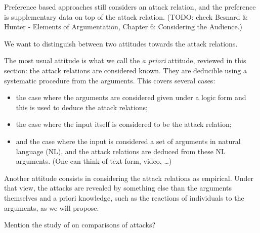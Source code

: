 \documentclass[version=3.21, pagesize, twoside=off, bibliography=totoc, DIV=calc, fontsize=12pt, a4paper, french, english]{scrartcl}
\begin{document}
Preference based approaches still considers an attack relation, and the preference is supplementary data on top of the attack relation. (TODO: check Besnard \& Hunter - Elements of Argumentation, Chapter 6: Considering the Audience.) 

We want to distinguish between two attitudes towards the attack relations. 

The most usual attitude is what we call the \emph{a priori} attitude, reviewed in this section: the attack relations are considered known. They are deducible using a systematic procedure from the arguments. This covers several cases:
\begin{itemize}
\item the case where the arguments are considered given under a logic form and this is used to deduce the attack relations;
\item the case where the input itself is considered to be the attack relation;
\item and the case where the input is considered a set of arguments in natural language (NL), and the attack relations are deduced from these NL arguments. (One can think of text form, video, …)
\end{itemize}

Another attitude consists in considering the attack relations as empirical. Under that view, the attacks are revealed by something else than the arguments themselves and a priori knowledge, such as the reactions of individuals to the arguments, as we will propose.

Mention the study of \cite{ICCS2018} on comparisons of attacks? 
\end{document}
